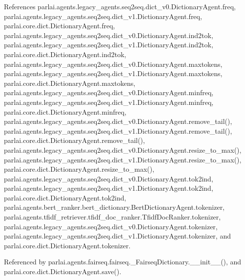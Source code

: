 References parlai.\+agents.\+legacy\+\_\+agents.\+seq2seq.\+dict\+\_\+v0.\+Dictionary\+Agent.\+freq, parlai.\+agents.\+legacy\+\_\+agents.\+seq2seq.\+dict\+\_\+v1.\+Dictionary\+Agent.\+freq, parlai.\+core.\+dict.\+Dictionary\+Agent.\+freq, parlai.\+agents.\+legacy\+\_\+agents.\+seq2seq.\+dict\+\_\+v0.\+Dictionary\+Agent.\+ind2tok, parlai.\+agents.\+legacy\+\_\+agents.\+seq2seq.\+dict\+\_\+v1.\+Dictionary\+Agent.\+ind2tok, parlai.\+core.\+dict.\+Dictionary\+Agent.\+ind2tok, parlai.\+agents.\+legacy\+\_\+agents.\+seq2seq.\+dict\+\_\+v0.\+Dictionary\+Agent.\+maxtokens, parlai.\+agents.\+legacy\+\_\+agents.\+seq2seq.\+dict\+\_\+v1.\+Dictionary\+Agent.\+maxtokens, parlai.\+core.\+dict.\+Dictionary\+Agent.\+maxtokens, parlai.\+agents.\+legacy\+\_\+agents.\+seq2seq.\+dict\+\_\+v0.\+Dictionary\+Agent.\+minfreq, parlai.\+agents.\+legacy\+\_\+agents.\+seq2seq.\+dict\+\_\+v1.\+Dictionary\+Agent.\+minfreq, parlai.\+core.\+dict.\+Dictionary\+Agent.\+minfreq, parlai.\+agents.\+legacy\+\_\+agents.\+seq2seq.\+dict\+\_\+v0.\+Dictionary\+Agent.\+remove\+\_\+tail(), parlai.\+agents.\+legacy\+\_\+agents.\+seq2seq.\+dict\+\_\+v1.\+Dictionary\+Agent.\+remove\+\_\+tail(), parlai.\+core.\+dict.\+Dictionary\+Agent.\+remove\+\_\+tail(), parlai.\+agents.\+legacy\+\_\+agents.\+seq2seq.\+dict\+\_\+v0.\+Dictionary\+Agent.\+resize\+\_\+to\+\_\+max(), parlai.\+agents.\+legacy\+\_\+agents.\+seq2seq.\+dict\+\_\+v1.\+Dictionary\+Agent.\+resize\+\_\+to\+\_\+max(), parlai.\+core.\+dict.\+Dictionary\+Agent.\+resize\+\_\+to\+\_\+max(), parlai.\+agents.\+legacy\+\_\+agents.\+seq2seq.\+dict\+\_\+v0.\+Dictionary\+Agent.\+tok2ind, parlai.\+agents.\+legacy\+\_\+agents.\+seq2seq.\+dict\+\_\+v1.\+Dictionary\+Agent.\+tok2ind, parlai.\+core.\+dict.\+Dictionary\+Agent.\+tok2ind, parlai.\+agents.\+bert\+\_\+ranker.\+bert\+\_\+dictionary.\+Bert\+Dictionary\+Agent.\+tokenizer, parlai.\+agents.\+tfidf\+\_\+retriever.\+tfidf\+\_\+doc\+\_\+ranker.\+Tfidf\+Doc\+Ranker.\+tokenizer, parlai.\+agents.\+legacy\+\_\+agents.\+seq2seq.\+dict\+\_\+v0.\+Dictionary\+Agent.\+tokenizer, parlai.\+agents.\+legacy\+\_\+agents.\+seq2seq.\+dict\+\_\+v1.\+Dictionary\+Agent.\+tokenizer, and parlai.\+core.\+dict.\+Dictionary\+Agent.\+tokenizer.



Referenced by parlai.\+agents.\+fairseq.\+fairseq.\+\_\+\+Fairseq\+Dictionary.\+\_\+\+\_\+init\+\_\+\+\_\+(), and parlai.\+core.\+dict.\+Dictionary\+Agent.\+save().

